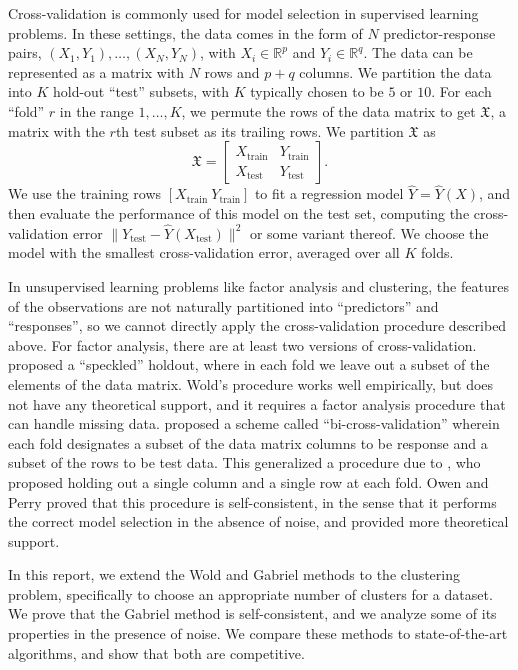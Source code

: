 \documentclass[11pt]{article}
\newcommand{\dataX}{\mathfrak{X}}
\newcommand{\Xtrain}{X_{\text{train}}}
\newcommand{\Ytrain}{Y_{\text{train}}}
\newcommand{\Xtest}{X_{\text{test}}}
\newcommand{\Ytest}{Y_{\text{test}}}
\begin{document}
Cross-validation is commonly used for model selection in supervised learning
problems.  In these settings, the data comes in the form of $N$
predictor-response pairs, $(X_1, Y_1), \dotsc, (X_N, Y_N)$, with $X_i \in
\mathbb{R}^{p}$ and $Y_i \in \mathbb{R}^{q}$.  The data can be represented as
a matrix with $N$ rows and $p + q$ columns.  We partition the data into $K$
hold-out ``test'' subsets, with $K$ typically chosen to be $5$ or $10$.  For each
``fold'' $r$ in the range $1, \dotsc, K$, we permute the rows of the data
matrix to get $\dataX$, a matrix with the $r$th test subset as its trailing
rows.  We partition $\dataX$ as
\[
  \dataX =
  \begin{bmatrix}
    \Xtrain & \Ytrain \\
    \Xtest  & \Ytest
  \end{bmatrix}.
\]
We use the training rows $[ \Xtrain\ \Ytrain ]$ to fit a regression model
$\hat Y = \hat Y(X)$, and then evaluate the performance of this model on the
test set, computing the cross-validation error $\|\Ytest - \hat Y(\Xtest)\|^2$
or some variant thereof.  We choose the model with the smallest
cross-validation error, averaged over all $K$ folds.


In unsupervised learning problems like factor analysis and clustering, the
features of the observations are not naturally partitioned into ``predictors''
and ``responses'', so we cannot directly apply the cross-validation procedure
described above.  For factor analysis, there are at least two versions of
cross-validation.  \citet{wold78cross} proposed a ``speckled'' holdout, where
in each fold we leave out a subset of the elements of the data matrix.  Wold's
procedure works well empirically, but does not have any theoretical support,
and it requires a factor analysis procedure that can handle missing data.
\citet{owen2009bi} proposed a scheme called ``bi-cross-validation'' wherein
each fold designates a subset of the data matrix columns to be response and a
subset of the rows to be test data.  This generalized a procedure due to
\citet{gabriel2002biblot}, who proposed holding out a single column and a
single row at each fold.  Owen and Perry proved that this procedure is
self-consistent, in the sense that it performs the correct model selection in
the absence of noise, and \citet{perry2009cross} provided more theoretical
support.


In this report, we extend the Wold and Gabriel methods to the clustering
problem, specifically to choose an appropriate number of clusters for a
dataset.  We prove that the Gabriel method is self-consistent, and we analyze
some of its properties in the presence of noise.  We compare these methods to
state-of-the-art algorithms, and show that both are competitive.
\end{document}

